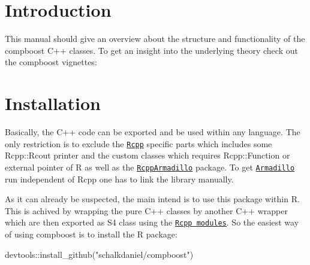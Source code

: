\hypertarget{index_intro_sec}{}\section{Introduction}\label{index_intro_sec}
This manual should give an overview about the structure and functionality of the {\ttfamily compboost} {\ttfamily C++} classes. To get an insight into the underlying theory check out the {\ttfamily compboost} vignettes\+:\hypertarget{index_install_sec}{}\section{Installation}\label{index_install_sec}
Basically, the {\ttfamily C++} code can be exported and be used within any language. The only restriction is to exclude the \href{https://cran.r-project.org/web/packages/Rcpp/vignettes/Rcpp-introduction.pdf}{\tt {\ttfamily Rcpp}} specific parts which includes some {\ttfamily Rcpp\+::\+Rcout} printer and the custom classes which requires {\ttfamily Rcpp\+::\+Function} or external pointer of {\ttfamily R} as well as the \href{https://cran.r-project.org/web/packages/RcppArmadillo/vignettes/RcppArmadillo-intro.pdf}{\tt {\ttfamily Rcpp\+Armadillo}} package. To get \href{http://arma.sourceforge.net}{\tt {\ttfamily Armadillo}} run independent of {\ttfamily Rcpp} one has to link the library manually.

As it can already be suspected, the main intend is to use this package within {\ttfamily R}. This is achived by wrapping the pure {\ttfamily C++} classes by another {\ttfamily C++} wrapper which are then exported as {\ttfamily S4} class using the \href{https://cran.r-project.org/web/packages/Rcpp/vignettes/Rcpp-modules.pdf}{\tt Rcpp modules}. So the easiest way of using {\ttfamily compboost} is to install the {\ttfamily R} package\+:


\begin{DoxyCode}
devtools::install\_github(\textcolor{stringliteral}{"schalkdaniel/compboost"})
\end{DoxyCode}
 